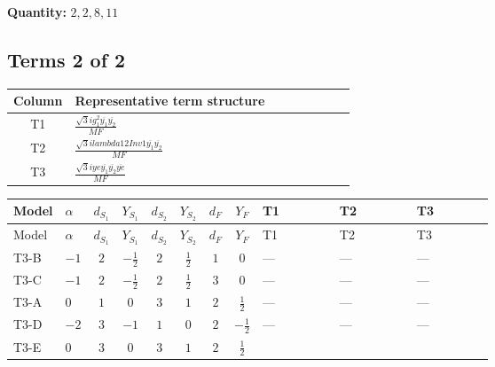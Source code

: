 \documentclass[8pt]{article}
\begin{document}
\begin{landscape}
\begin{longtable}{@{}llcccccc >{\raggedright\arraybackslash}p{0.21\linewidth} >{\raggedright\arraybackslash}p{0.21\linewidth} >{\raggedright\arraybackslash}p{0.21\linewidth}@{}}
\midrule
\bottomrule
\end{longtable}
\clearpage
\noindent\textbf{Quantity: }$\mathrm{2,2,8,11}$\par\smallskip
\subsection*{Terms 2 of 2}
\begin{center}
\begin{tabular}{@{}c >{\raggedright\arraybackslash}p{0.82\linewidth}@{}}
\toprule
Column & Representative term structure \\
\midrule
T1 & \(\displaystyle \frac{\sqrt{3} i g_{1}^{2} \overline{y_{1}} \overline{y_{2}}}{MF}\) \\
\midrule
T2 & \(\displaystyle \frac{\sqrt{3} i lambda12Inv1 \overline{y_{1}} \overline{y_{2}}}{MF}\) \\
\midrule
T3 & \(\displaystyle \frac{\sqrt{3} i ye \overline{y_{1}} \overline{y_{2}} \overline{ye}}{MF}\) \\
\midrule
\bottomrule
\end{tabular}
\end{center}
\smallskip
\tiny
\begin{longtable}{@{}llcccccc >{\raggedright\arraybackslash}p{0.21\linewidth} >{\raggedright\arraybackslash}p{0.21\linewidth} >{\raggedright\arraybackslash}p{0.21\linewidth}@{}}
\toprule
Model & $\alpha$ & $d_{S_1}$ & $Y_{S_1}$ & $d_{S_2}$ & $Y_{S_2}$ & $d_F$ & $Y_F$ & T1 & T2 & T3 \\
\midrule
\endfirsthead
\toprule
Model & $\alpha$ & $d_{S_1}$ & $Y_{S_1}$ & $d_{S_2}$ & $Y_{S_2}$ & $d_F$ & $Y_F$ & T1 & T2 & T3 \\
\midrule
\endhead
T3-B & $-1$ & $2$ & $-\frac{1}{2}$ & $2$ & $\frac{1}{2}$ & $1$ & $0$ & --- & --- & --- \\
\midrule
T3-C & $-1$ & $2$ & $-\frac{1}{2}$ & $2$ & $\frac{1}{2}$ & $3$ & $0$ & --- & --- & --- \\
\midrule
T3-A & $0$ & $1$ & $0$ & $3$ & $1$ & $2$ & $\frac{1}{2}$ & --- & --- & --- \\
\midrule
T3-D & $-2$ & $3$ & $-1$ & $1$ & $0$ & $2$ & $-\frac{1}{2}$ & --- & --- & --- \\
\midrule
T3-E & $0$ & $3$ & $0$ & $3$ & $1$ & $2$ & $\frac{1}{2}$ & \scriptsize\adjustbox{max width=\linewidth}{$\begin{gathered} - \frac{\sqrt{3} i g_{1}^{2} \overline{y_{1}} \overline{y_{2}}}{8 MF}\end{gathered}$} & \scriptsize\adjustbox{max width=\linewidth}{$\begin{gathered} \frac{\sqrt{3} i lambda12Inv1 \overline{y_{1}} \overline{y_{2}}}{6 MF}\end{gathered}$} & \scriptsize\adjustbox{max width=\linewidth}{$\begin{gathered} \frac{\sqrt{3} i ye \overline{y_{1}} \overline{y_{2}} \overline{ye}}{12 MF}\end{gathered}$} \\

\end{longtable}
\end{landscape}
\end{document}
